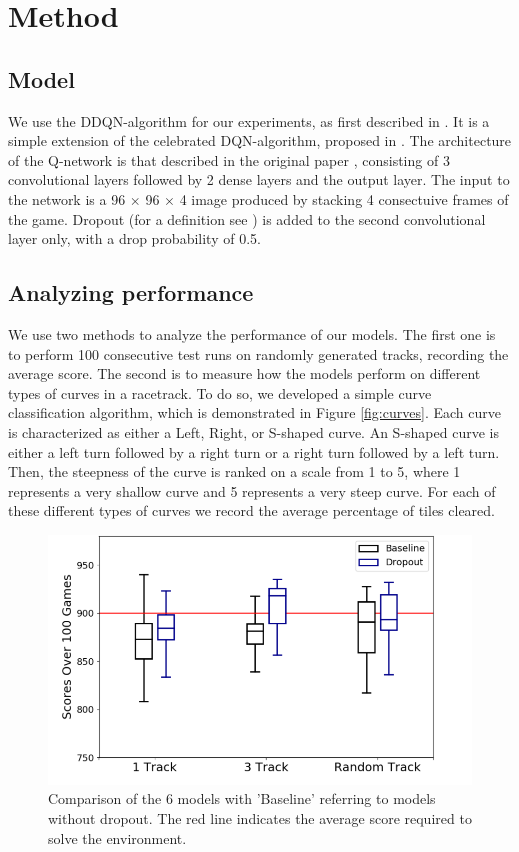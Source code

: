 \documentclass{article}
\begin{document}
\section{Method}

\subsection{Model}
We use the DDQN-algorithm for our experiments, as first described in \cite{DDQN}. It is a simple extension of the celebrated DQN-algorithm, 
proposed in \cite{DQN}. The architecture of the Q-network is that described in the original paper \cite{DQN}, consisting of
3 convolutional layers followed by 2 dense layers and the output layer. The input to the network is a 96 $\times$ 96 $\times$ 4 image 
produced by stacking 4 consectuive frames of the game. Dropout (for a definition see \cite{Dropout}) is added to the second convolutional layer only, with a drop probability of 0.5. 

\subsection{Analyzing performance}
We use two methods to analyze the performance of our models. The first one is to perform 100 consecutive test runs on randomly generated tracks, recording the average score. The second is to measure how the models perform on different types of curves in a racetrack. To do so, we developed a simple curve classification algorithm, which is demonstrated in Figure \ref{fig:curves}. Each curve is characterized as either a Left, Right, or S-shaped curve. An S-shaped curve is either a left turn followed by a right turn or a right turn followed by a left turn. Then, the steepness of the curve is ranked on a scale from 1 to 5, where 1 represents a very shallow curve and 5 represents a very steep curve. For each of these different types of curves we record the average percentage of tiles cleared.  

\begin{figure}[!h]
\captionsetup{justification=centering}
\centering
\centering
\includegraphics[width=\linewidth]{scores_notitle.png}
\caption{Comparison of the 6 models with 'Baseline' referring to models without dropout. The red line indicates the average score required to solve the environment. }
\label{fig:scores}
\end{figure}
\end{document}
